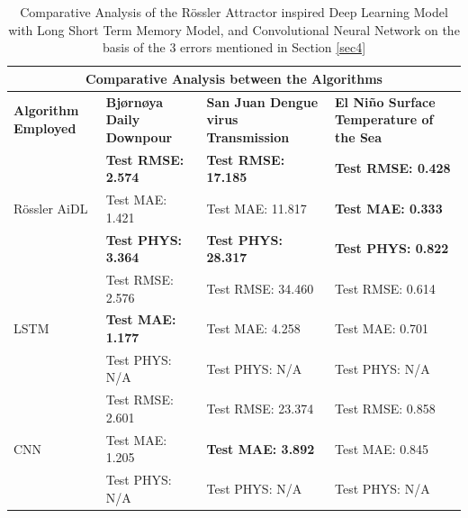 \documentclass[conference]{IEEEtran}
\begin{document}
\begin{table}[htbp]
  \centering
\begin{tabular}{ |p{3cm}||p{3cm}|p{3cm}|p{3cm}|  }
 \hline
 \multicolumn{4}{|c|}{Comparative Analysis between the Algorithms} \\
 \hline
 \textbf{Algorithm Employed}& \textbf{Bjørnøya Daily Downpour} &\textbf{San Juan Dengue virus Transmission}&\textbf{El Niño Surface Temperature of the Sea}\\
 \hline
     & \textbf{Test RMSE: 2.574 }   &\textbf{Test RMSE: 17.185}&   \textbf{Test RMSE: 0.428}\\
 Rössler AiDL&   Test MAE: 1.421  & Test MAE: 11.817   &\textbf{Test MAE: 0.333}\\
  &\textbf{Test PHYS: 3.364} & \textbf{Test PHYS: 28.317}&  \textbf{Test PHYS: 0.822}\\
 \hline
     & Test RMSE: 2.576    &Test RMSE: 34.460&   Test RMSE: 0.614\\
 LSTM&   \textbf{Test MAE: 1.177}  & Test MAE: 4.258   &Test MAE: 0.701\\
  &Test PHYS: N/A & Test PHYS: N/A&  Test PHYS: N/A\\
 \hline
     & Test RMSE: 2.601    &Test RMSE: 23.374&   Test RMSE: 0.858\\
 CNN&   Test MAE: 1.205  & \textbf{Test MAE: 3.892}   &Test MAE: 0.845\\
  &Test PHYS: N/A & Test PHYS: N/A&  Test PHYS: N/A\\
 \hline
\end{tabular}
  \caption{Comparative Analysis of the Rössler Attractor inspired Deep Learning Model with Long Short Term Memory Model, and Convolutional Neural Network on the basis of the 3 errors mentioned in Section \ref{sec4}}
  \label{tab1}
\end{table}
\end{document}
